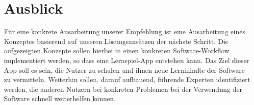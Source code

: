 \chapter{Ausblick}
Für eine konkrete Ausarbeitung unserer Empfehlung ist eine Ausarbeitung eines Konzeptes basierend auf unseren Lösungsansätzen der nächste Schritt. Die aufgezeigten Konzepte sollen hierbei in einen konkreten Software-Workflow implementiert werden, so dass eine Lernspiel-App entstehen kann. Das Ziel dieser App soll es sein, die Nutzer zu schulen und ihnen neue Lerninhalte der Software zu vermitteln. Weiterhin sollen, darauf aufbauend, führende Experten identifiziert werden, die anderen Nutzern bei konkreten Problemen bei der Verwendung der Software schnell weiterhelfen können.


